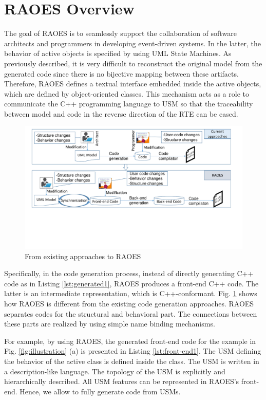 \section{RAOES Overview}
\label{sec:overview}
The goal of RAOES is to seamlessly support the collaboration of software architects and programmers in developing event-driven systems.
In the latter, the behavior of active objects is specified by using UML State Machines.
As previously described, it is very difficult to reconstruct the original model from the generated code since there is no bijective mapping between these artifacts.
Therefore, RAOES defines a textual interface embedded inside the active objects, which are defined by object-oriented classes. 
This mechanism acts as a role to communicate the C++ programming language to USM so that the traceability between model and code in the reverse direction of the RTE can be eased.

\begin{figure}
	\centering
	\includegraphics[clip, trim=0.6cm 6.4cm 1.4cm 0.5cm, width=1.0\columnwidth]{figures/frontend}
	\caption{From existing approaches to RAOES} 
	\label{fig:raoes}
\end{figure}

Specifically, in the code generation process, instead of directly generating C++ code as in Listing \ref{lst:generated1}, RAOES produces a front-end C++ code.
The latter is an intermediate representation, which is C++-conformant.
Fig. \ref{fig:raoes} shows how RAOES is different from the existing code generation approaches.
RAOES separates codes for the structural and behavioral part.
The connections between these parts are realized by using simple name binding mechanisms.

For example, by using RAOES, the generated front-end code for the example in Fig. \ref{fig:illustration} (a) is presented in Listing \ref{lst:front-end1}.
The USM defining the behavior of the active class  is defined inside the class.
The USM is written in a description-like language.
The topology of the USM is explicitly and hierarchically described.
All USM features can be represented in RAOES's front-end.
Hence, we allow to fully generate code from USMs.

